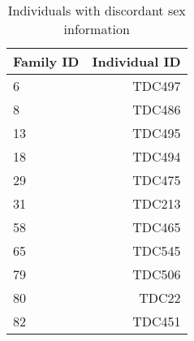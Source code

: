 \begin{table}[h]
\centering
\caption{Individuals with discordant sex information} 
\begin{tabular}{lr}
  \hline
Family ID & Individual ID \\ 
  \hline
6&TDC497 \\
8&TDC486 \\
13&TDC495 \\
18&TDC494 \\
29&TDC475 \\
31&TDC213 \\
58&TDC465 \\
65&TDC545 \\
79&TDC506 \\
80&TDC22 \\
82&TDC451 \\
   \hline
\end{tabular}
\end{table}
